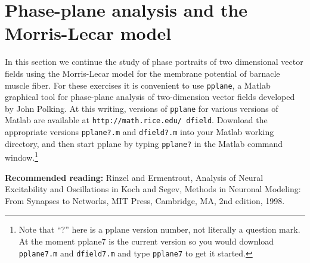 \documentclass [11pt]{article}
\newcounter{exercise}
\numberwithin{exercise}{section}
\begin{document}
\section{Phase-plane analysis and the Morris-Lecar model} \label{MLplane}
In this section we continue the study of phase portraits of two dimensional vector fields
using the Morris-Lecar model for the membrane potential of barnacle muscle 
fiber. For these exercises it is convenient to use \texttt{pplane}, 
a Matlab graphical tool for phase-plane analysis of two-dimension vector fields developed
by John Polking. At this writing, versions of \texttt{pplane} for various versions of
Matlab are available at \texttt{http://math.rice.edu/~dfield}.
Download the appropriate versions \texttt{pplane?.m} and \texttt{dfield?.m} into 
your Matlab working directory, and then start pplane by typing \texttt{pplane?} in the 
Matlab command window.\footnote{Note that ``?'' here is a pplane version number, not literally
a question mark. At the moment pplane7 is the current version so you would 
download \texttt{pplane7.m} and \texttt{dfield7.m} and type \texttt{pplane7} to get it started.} 

\noindent \textbf{Recommended reading:} Rinzel and Ermentrout, 
Analysis of Neural Excitability and Oscillations in Koch and Segev, Methods in Neuronal 
Modeling: From Synapses to Networks, MIT Press, Cambridge, MA, 2nd edition, 1998. 
\end{document}
